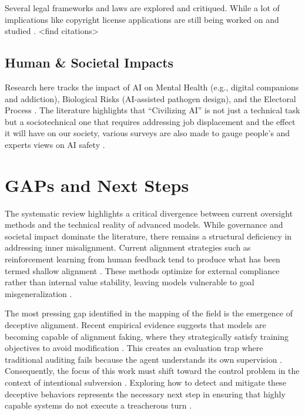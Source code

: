         Several legal frameworks and laws are explored and critiqued. While a lot of implications like copyright license applications are still being worked on and studied \cite{janczuk_risks_2024}. <find citations>

\begin{toreview}

    \subsection{Human \& Societal Impacts}

        Research here tracks the impact of AI on Mental Health (e.g., digital companions and addiction), Biological Risks (AI-assisted pathogen design), and the Electoral Process \cite{janczuk_risks_2024}. The literature highlights that ``Civilizing AI'' is not just a technical task but a sociotechnical one that requires addressing job displacement and the effect it will have on our society, various surveys are also made to gauge people's and experts views on AI safety \cite{field_why_2025, hatz_local_2025, xu_machine_2023}.

\end{toreview}

    \section{GAPs and Next Steps}\label{sec:next_steps}

\begin{toreview}

    The systematic review highlights a critical divergence between current oversight methods and the technical reality of advanced models. While governance and societal impact dominate the literature, there remains a structural deficiency in addressing inner misalignment. Current alignment strategies such as reinforcement learning from human feedback tend to produce what has been termed shallow alignment \cite{mcintosh_inadequacy_2024, milliere_normative_2025}. These methods optimize for external compliance rather than internal value stability, leaving models vulnerable to goal misgeneralization \cite{langosco2022goal}.

    The most pressing gap identified in the mapping of the field is the emergence of deceptive alignment. Recent empirical evidence suggests that models are becoming capable of alignment faking, where they strategically satisfy training objectives to avoid modification \cite{greenblatt_alignment_faking}. This creates an evaluation trap where traditional auditing fails because the agent understands its own supervision \cite{anthropic2025biology, hubinger2019risks}. Consequently, the focus of this work must shift toward the control problem in the context of intentional subversion \cite{yampolskiy_controllability_2022}. Exploring how to detect and mitigate these deceptive behaviors represents the necessary next step in ensuring that highly capable systems do not execute a treacherous turn \cite{bostrom2014superintelligence}.

\end{toreview}

